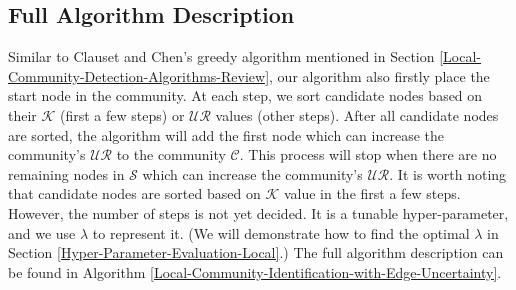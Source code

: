 \documentclass[\main/thesis.tex]{subfiles}
\begin{document}
\subsection{Full Algorithm Description} \label{Full-Algorithm-Description-local}
Similar to Clauset and Chen's greedy algorithm mentioned in Section \ref{Local-Community-Detection-Algorithms-Review}, our algorithm also firstly place the start node in the community. At each step, we sort candidate nodes based on their $\mathcal{K}$ (first a few steps) or $\mathcal{UR}$ values (other steps). After all candidate nodes are sorted, the algorithm will add the first node which can increase the community's $\mathcal{UR}$ to the community $\mathcal{C}$. This process will stop when there are no remaining nodes in $\mathcal{S}$ which can increase the community's $\mathcal{UR}$. It is worth noting that candidate nodes are sorted based on $\mathcal{K}$ value in the first a few steps. However, the number of steps is not yet decided. It is a tunable hyper-parameter, and we use $\lambda$ to represent it. (We will demonstrate how to find the optimal $\lambda$ in Section \ref{Hyper-Parameter-Evaluation-Local}.) The full algorithm description can be found in Algorithm \ref{Local-Community-Identification-with-Edge-Uncertainty}.
\end{document}
